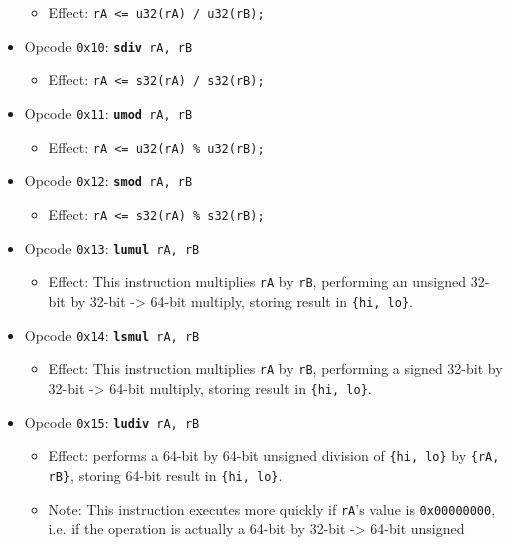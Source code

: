 \documentclass{article}
\begin{document}
\begin{itemize}
\begin{itemize}
		\item Effect: \texttt{rA <= u32(rA) / u32(rB);}
		\end{itemize}
	\item Opcode \texttt{0x10}:
		\texttt{\textbf{sdiv} rA, rB}
		\begin{itemize}
		\item Effect: \texttt{rA <= s32(rA) / s32(rB);}
		\end{itemize}
	\item Opcode \texttt{0x11}:
		\texttt{\textbf{umod} rA, rB}
		\begin{itemize}
		\item Effect: \texttt{rA <= u32(rA) \% u32(rB);}
		\end{itemize}
	\item Opcode \texttt{0x12}:
		\texttt{\textbf{smod} rA, rB}
		\begin{itemize}
		\item Effect: \texttt{rA <= s32(rA) \% s32(rB);}
		\end{itemize}
	\item Opcode \texttt{0x13}:
		\texttt{\textbf{lumul} rA, rB}
		\begin{itemize}
		\item Effect: This instruction multiplies \texttt{rA} by
		\texttt{rB}, performing an unsigned 32-bit by 32-bit -> 64-bit
		multiply, storing result in \texttt{\{hi, lo\}}.
		\end{itemize}
	\item Opcode \texttt{0x14}:
		\texttt{\textbf{lsmul} rA, rB}
		\begin{itemize}
		\item Effect: This instruction multiplies \texttt{rA} by
		\texttt{rB}, performing a signed 32-bit by 32-bit -> 64-bit
		multiply, storing result in \texttt{\{hi, lo\}}.
		\end{itemize}
	\item Opcode \texttt{0x15}:
		\texttt{\textbf{ludiv} rA, rB}
		\begin{itemize}
		\item Effect: performs a 64-bit by 64-bit unsigned division of
		\texttt{\{hi, lo\}} by \texttt{\{rA, rB\}}, storing 64-bit
		result in \texttt{\{hi, lo\}}.
		\item Note: This instruction executes more quickly if
		\texttt{rA}'s value is \texttt{0x00000000}, i.e. if the
		operation is actually a 64-bit by 32-bit -> 64-bit unsigned

\end{itemize}
\end{itemize}
\end{document}
